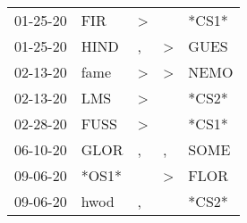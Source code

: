 \begin{supertabular}{p{0.07\textwidth}p{0.06\textwidth}p{0.02\textwidth}p{0.02\textwidth}p{0.06\textwidth}}
          01-25-20\textsuperscript{} &            FIR\textsuperscript{} &     \textgreater &                  &                            *CS1* \\
          01-25-20\textsuperscript{} &           HIND\textsuperscript{} &                , &     \textgreater &           GUES\textsuperscript{} \\
          02-13-20\textsuperscript{} &           fame\textsuperscript{} &     \textgreater &     \textgreater &           NEMO\textsuperscript{} \\
          02-13-20\textsuperscript{} &            LMS\textsuperscript{} &     \textgreater &                  &                            *CS2* \\
          02-28-20\textsuperscript{} &           FUSS\textsuperscript{} &     \textgreater &                  &                            *CS1* \\
          06-10-20\textsuperscript{} &           GLOR\textsuperscript{} &                , &                , &           SOME\textsuperscript{} \\
          09-06-20\textsuperscript{} &                            *OS1* &                  &     \textgreater &           FLOR\textsuperscript{} \\
          09-06-20\textsuperscript{} &           hwod\textsuperscript{} &                , &                  &                            *CS2* \\
\end{supertabular}
